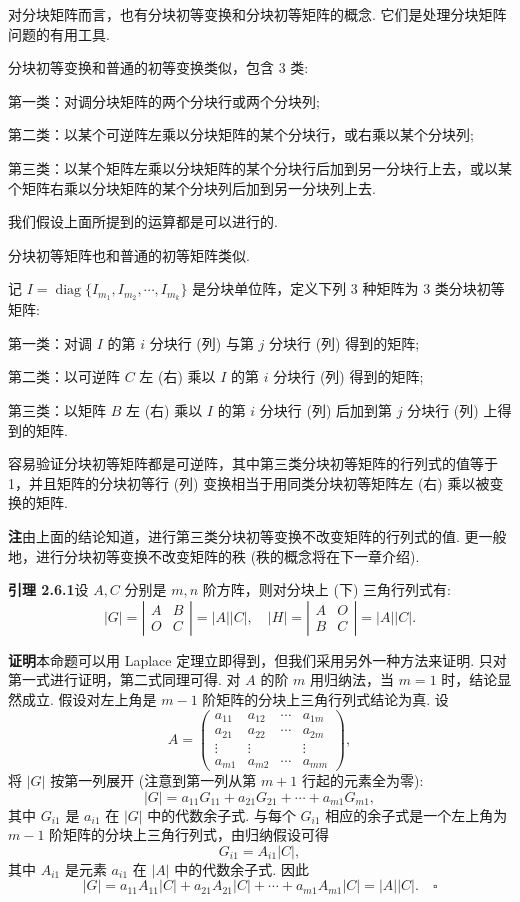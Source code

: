 \documentclass[UTF8,12pt,a4paper,fontset=fandol]{ctexart}
\begin{document}
对分块矩阵而言，也有分块初等变换和分块初等矩阵的概念. 它们是处理分块矩阵问题的有用工具.

分块初等变换和普通的初等变换类似，包含 3 类:

第一类：对调分块矩阵的两个分块行或两个分块列;

第二类：以某个可逆阵左乘以分块矩阵的某个分块行，或右乘以某个分块列;

第三类：以某个矩阵左乘以分块矩阵的某个分块行后加到另一分块行上去，或以某个矩阵右乘以分块矩阵的某个分块列后加到另一分块列上去.

我们假设上面所提到的运算都是可以进行的.

分块初等矩阵也和普通的初等矩阵类似.

记 $I=\operatorname{diag}\{I_{m_1},I_{m_2},\cdots,I_{m_k}\}$ 是分块单位阵，定义下列 3 种矩阵为 3 类分块初等矩阵:

第一类：对调 $I$ 的第 $i$ 分块行 (列) 与第 $j$ 分块行 (列) 得到的矩阵;

第二类：以可逆阵 $C$ 左 (右) 乘以 $I$ 的第 $i$ 分块行 (列) 得到的矩阵;

第三类：以矩阵 $B$ 左 (右) 乘以 $I$ 的第 $i$ 分块行 (列) 后加到第 $j$ 分块行 (列) 上得到的矩阵.

容易验证分块初等矩阵都是可逆阵，其中第三类分块初等矩阵的行列式的值等于 1，并且矩阵的分块初等行 (列) 变换相当于用同类分块初等矩阵左 (右) 乘以被变换的矩阵.

\noindent\textbf{注}\quad 由上面的结论知道，进行第三类分块初等变换不改变矩阵的行列式的值. 更一般地，进行分块初等变换不改变矩阵的秩 (秩的概念将在下一章介绍).

\noindent\textbf{引理 2.6.1}\quad 设 $A,C$ 分别是 $m,n$ 阶方阵，则对分块上 (下) 三角行列式有:
\[
|G|=\left|\begin{array}{cc}
A & B\\
O & C
\end{array}\right|=|A||C|,\quad
|H|=\left|\begin{array}{cc}
A & O\\
B & C
\end{array}\right|=|A||C|.
\]

\noindent\textbf{证明}\quad 本命题可以用 Laplace 定理立即得到，但我们采用另外一种方法来证明. 只对第一式进行证明，第二式同理可得. 对 $A$ 的阶 $m$ 用归纳法，当 $m=1$ 时，结论显然成立. 假设对左上角是 $m-1$ 阶矩阵的分块上三角行列式结论为真. 设
\[
A=\left(\begin{array}{cccc}
a_{11} & a_{12} & \cdots & a_{1m}\\
a_{21} & a_{22} & \cdots & a_{2m}\\
\vdots & \vdots & & \vdots\\
a_{m1} & a_{m2} & \cdots & a_{mm}
\end{array}\right),
\]
将 $|G|$ 按第一列展开 (注意到第一列从第 $m+1$ 行起的元素全为零):
\[
|G|=a_{11}G_{11}+a_{21}G_{21}+\cdots+a_{m1}G_{m1},
\]
其中 $G_{i1}$ 是 $a_{i1}$ 在 $|G|$ 中的代数余子式. 与每个 $G_{i1}$ 相应的余子式是一个左上角为 $m-1$ 阶矩阵的分块上三角行列式，由归纳假设可得
\[
G_{i1}=A_{i1}|C|,
\]
其中 $A_{i1}$ 是元素 $a_{i1}$ 在 $|A|$ 中的代数余子式. 因此
\[
|G|=a_{11}A_{11}|C|+a_{21}A_{21}|C|+\cdots+a_{m1}A_{m1}|C|=|A||C|. \quad \square
\]
\end{document}
